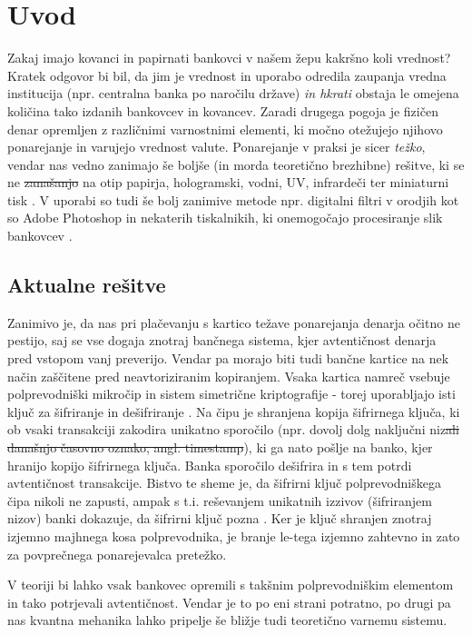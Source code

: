 \documentclass[12pt]{article}
\providecommand{\DIFadd}[1]{{\protect\color{blue}\uwave{#1}}} %
\providecommand{\DIFdel}[1]{{\protect\color{red}\sout{#1}}}                      %
\providecommand{\DIFaddbegin}{} %
\providecommand{\DIFaddend}{} %
\providecommand{\DIFdelbegin}{} %
\providecommand{\DIFdelend}{} %
\newcommand{\DIFscaledelfig}{0.5}
\newlength{\DIFdelgraphicswidth} %
\newlength{\DIFdelgraphicsheight} %
\newcommand{\DIFaddincludegraphics}[2][]{{\color{blue}\fbox{\DIFOincludegraphics[#1]{#2}}}} %
\newcommand{\DIFdelincludegraphics}[2][]{%
\sbox{\DIFdelgraphicsbox}{\DIFOincludegraphics[#1]{#2}}%
\settoboxwidth{\DIFdelgraphicswidth}{\DIFdelgraphicsbox} %
\settoboxtotalheight{\DIFdelgraphicsheight}{\DIFdelgraphicsbox} %
\scalebox{\DIFscaledelfig}{%
\parbox[b]{\DIFdelgraphicswidth}{\usebox{\DIFdelgraphicsbox}\\[-\baselineskip] \rule{\DIFdelgraphicswidth}{0em}}\llap{\resizebox{\DIFdelgraphicswidth}{\DIFdelgraphicsheight}{%
\setlength{\unitlength}{\DIFdelgraphicswidth}%
\begin{picture}(1,1)%
\thicklines\linethickness{2pt} %
{\color[rgb]{1,0,0}\put(0,0){\framebox(1,1){}}}%
{\color[rgb]{1,0,0}\put(0,0){\line( 1,1){1}}}%
{\color[rgb]{1,0,0}\put(0,1){\line(1,-1){1}}}%
\end{picture}%
}\hspace*{3pt}}} %
} %
\DeclareRobustCommand{\DIFaddbegin}{\DIFOaddbegin \let\includegraphics\DIFaddincludegraphics} %
\DeclareRobustCommand{\DIFaddend}{\DIFOaddend \let\includegraphics\DIFOincludegraphics} %
\DeclareRobustCommand{\DIFdelbegin}{\DIFOdelbegin \let\includegraphics\DIFdelincludegraphics} %
\DeclareRobustCommand{\DIFdelend}{\DIFOaddend \let\includegraphics\DIFOincludegraphics} %
\begin{document}
 \section{Uvod}
	Zakaj imajo kovanci in papirnati bankovci v našem žepu kakršno koli vrednost? Kratek odgovor bi bil, da jim je vrednost in uporabo odredila zaupanja vredna institucija (npr. centralna banka po naročilu države) \emph{in hkrati} obstaja le omejena količina tako izdanih bankovcev in kovancev. Zaradi drugega pogoja je fizičen denar opremljen z različnimi varnostnimi elementi, ki močno otežujejo njihovo ponarejanje in varujejo vrednost valute. Ponarejanje v praksi je sicer \emph{težko}, vendar nas vedno zanimajo še boljše (in morda teoretično brezhibne) rešitve, ki se ne \DIFdelbegin \DIFdel{zanašanjo }\DIFdelend \DIFaddbegin \DIFadd{zanašajo }\DIFaddend na otip papirja, hologramski, vodni, UV, infrardeči ter miniaturni tisk \cite{bankSecurityFeatures2018}.  V uporabi so tudi še bolj zanimive metode npr. digitalni filtri v orodjih kot so Adobe Photoshop in nekaterih tiskalnikih, ki onemogočajo procesiranje slik bankovcev \cite{SoftwareDetectionCurrency}. 

\subsection{Aktualne rešitve}

\par Zanimivo je, da nas pri plačevanju s kartico težave ponarejanja denarja očitno ne pestijo, saj se vse dogaja znotraj bančnega sistema, kjer avtentičnost denarja pred vstopom vanj preverijo. Vendar pa morajo biti tudi bančne kartice na nek način zaščitene pred neavtoriziranim kopiranjem. Vsaka kartica namreč vsebuje polprevodniški mikročip in sistem simetrične kriptografije - torej uporabljajo isti ključ za šifriranje in dešifriranje \cite{CS101IntroductionComputing}. Na čipu je shranjena kopija šifrirnega ključa, ki ob vsaki transakciji zakodira unikatno sporočilo (npr. dovolj dolg naključni niz\DIFdelbegin \DIFdel{ali današnjo časovno oznako, angl. timestamp}\DIFdelend ), ki ga nato pošlje na banko, kjer hranijo kopijo šifrirnega ključa. Banka sporočilo dešifrira in s tem potrdi avtentičnost transakcije. Bistvo te sheme je, da šifrirni ključ polprevodniškega čipa nikoli ne zapusti, ampak s t.i. reševanjem unikatnih izzivov (šifriranjem nizov) banki dokazuje, da šifrirni ključ pozna \cite{CS101IntroductionComputing}. Ker je ključ shranjen znotraj izjemno majhnega kosa polprevodnika, je branje le-tega izjemno zahtevno \cite{christopheDescramblingDataReading2006} in zato za povprečnega ponarejevalca pretežko.
\par
V teoriji bi lahko vsak bankovec opremili s takšnim polprevodniškim elementom in tako potrjevali avtentičnost. Vendar je to po eni strani potratno, po drugi pa nas kvantna mehanika lahko pripelje še bližje tudi teoretično varnemu sistemu. 
\end{document}
